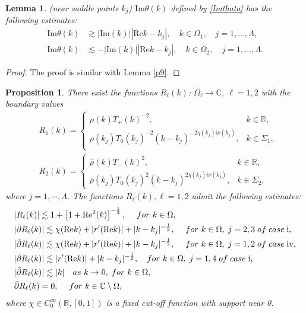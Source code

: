 \documentclass[11pt]{article}
\numberwithin{equation}{section}
\newtheorem{lemma}{Lemma}
\newtheorem{Proposition}{Proposition}
\begin{document}
\begin{lemma}\label{p10}\textup{(}near saddle points $k_j$\textup{)}
     $\mathrm{Im}\theta(k)$ defined by \eqref{Imthata} has the following estimates:
    \begin{align*}
        \mathrm{Im}\theta(k)&\gtrsim |\mathrm{Im}(k)|\left|\mathrm{Re}k-k_j\right|,\quad k\in\Omega_1,\quad j=1,\dots,\Lambda,\\
\mathrm{Im}\theta(k)&\lesssim -|\mathrm{Im}(k)|\left|\mathrm{Re}k-k_j\right|,\quad k\in\Omega_2,\quad j=1,\dots,\Lambda.
    \end{align*}
\end{lemma}
\begin{proof}
    The proof is similar with Lemma \ref{p9}.
\end{proof}

\begin{Proposition}\label{p11}
There exist  the functions $R_{\ell}(k)$: $\bar{\Omega}_{\ell}\to \mathbb{C}$, $\ell=1,2$  with the boundary values
	\begin{align} &R_{1}(k)=\left\{\begin{array}{ll}
	\rho(k)T_+(k)^{-2}, &k\in \mathbb{R},\\[4pt]
 \rho(k_j)T_0(k_j)^{-2} (k-k_j)^{-2\eta(k_j)i\nu(k_j)},  &k\in \Sigma_{1},\\
	\end{array}\right.\label{eq4} \\[5pt]
	&R_{2}(k)=\left\{\begin{array}{ll} \bar{\rho}(k)T_-(k)^{2},
 &k\in  \mathbb{R},\\[4pt] \bar{\rho}(k_j)T_0(k_j)^{2}(k-k_j)^{2\eta(k_j)i\nu(k_j)}, &k\in \Sigma_{2},
	\end{array} \right.
	\end{align}	
where $j=1,\cdots, \Lambda$.
The functions  $R_{\ell}(k), \ell=1,2$ admit the following estimates:
	\begin{align}
    &|R_{\ell}(k)|\lesssim 1+\left[1+\mathrm{Re}^2(k)\right]^{-\frac{1}{2}},\quad\;for\ k \in\Omega,\label{eq5}\\
    &|\bar{\partial}R_{\ell}(k)|\lesssim\chi(\mathrm{Re}k)+|r^\prime(\mathrm{Re}k)|+|k-k_j|^{-\frac{1}{2}}, \quad   \;for\  k\in \Omega,\;j=2,3 \;of\;case\;\textup{\uppercase\expandafter{\romannumeral1}},\label{eq6}\\
     &|\bar{\partial}R_{\ell}(k)|\lesssim \chi(\mathrm{Re}k)+|r'(\mathrm{Re}k)|+|k-k_j|^{-\frac{1}{2}}, \quad \; for\   k\in \Omega, \;j=1,2\;of\;case\;\textup{\uppercase\expandafter{\romannumeral4}},\label{eq7}\\
	&|\bar{\partial}R_{\ell}(k)|\lesssim|r'(\mathrm{Re}k)|+|k-k_j|^{-\frac{1}{2}}, \quad  for\   k\in \Omega, \;j=1,4\;of\;case\;\textup{\uppercase\expandafter{\romannumeral1}},\label{eq8}\\
&|\bar{\partial}R_{\ell}(k)|\lesssim|k| \quad as\ k\to0,\;for\ k\in \Omega,\label{eq9}\\
&\bar{\partial}R_{\ell}(k)=0,\quad \;for\ k\in\mathbb{C}\setminus\Omega,\nonumber
	\end{align}
where $\chi \in C^{\infty}_0(\mathbb{R},[0,1])$ is a fixed cut-off function with support near 0.
\end{Proposition}
\end{document}
